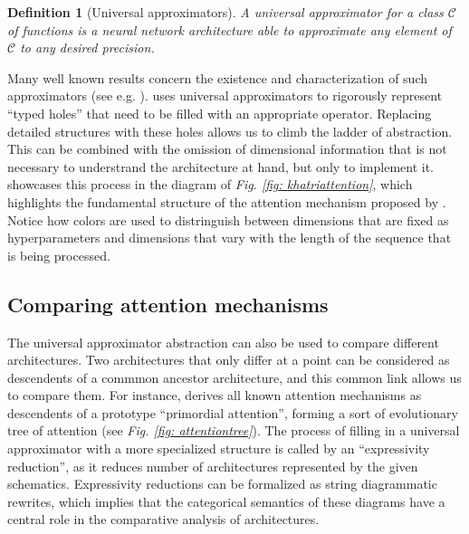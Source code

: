 \documentclass[11pt,a4paper,openright,twoside]{report}
\newcounter{mycounter}
\theoremstyle{plain}
\newtheorem{definition}[mycounter]{Definition}
\theoremstyle{definition}
\newcommand\dblquote[1]{\textquotedblleft #1\textquotedblright}
\begin{document}
\begin{definition}[Universal approximators]
  A universal approximator for a class $\mathcal{C}$ of functions is a neural network architecture able to approximate any element of $\mathcal{C}$ to any desired precision.
\end{definition}

Many well known results concern the existence and characterization of such approximators (see e.g. \cite{cybenko1989approximation}). \cite{khatri2024anatomy} uses universal approximators to rigorously represent \dblquote{typed holes} that need to be filled with an appropriate operator. Replacing detailed structures with these holes allows us to climb the ladder of abstraction. This can be combined with the omission of dimensional information that is not necessary to understrand the architecture at hand, but only to implement it. \cite{khatri2024anatomy} showcases this process in the diagram of \textit{Fig. \ref{fig: khatriattention}}, which highlights the fundamental structure of the attention mechanism proposed by \cite{vaswani2017attention}. Notice how colors are used to distringuish between dimensions that are fixed as hyperparameters and dimensions that vary with the length of the sequence that is being processed.

\subsection{Comparing attention mechanisms}

The universal approximator abstraction can also be used to compare different architectures. Two architectures that only differ at a point can be considered as descendents of a commmon ancestor architecture, and this common link allows us to compare them. For instance, \cite{khatri2024anatomy} derives all known attention mechanisms as descendents of a prototype \dblquote{primordial attention}, forming a sort of evolutionary tree of attention (see \textit{Fig. \ref{fig: attentiontree}}). The process of filling in a universal approximator with a more specialized structure is called by \cite{khatri2024anatomy} an \dblquote{expressivity reduction}, as it reduces number of architectures represented by the given schematics. Expressivity reductions can be formalized as string diagrammatic rewrites, which implies that the categorical semantics of these diagrams have a central role in the comparative analysis of architectures.
\end{document}
